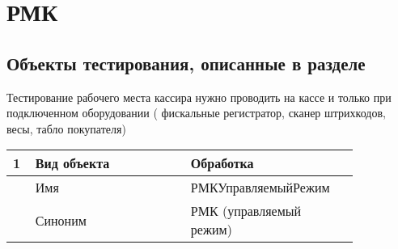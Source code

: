 \section{РМК}
\subsection{Объекты тестирования, описанные в разделе}

Тестирование рабочего места кассира нужно проводить на кассе и только при подключенном оборудовании ( фискальные регистратор, сканер штрихкодов, весы, табло покупателя)
\begin{longtable}{p{0.05\linewidth}p{0.4\linewidth}p{0.4\linewidth}}
    \hline
    1 & Вид объекта & Обработка \\
    \hline
    & Имя & РМКУправляемыйРежим \\
    \hline
    & Синоним  & РМК (управляемый режим) \\
    \hline


    \bottomrule %
\end{longtable}

\newpage
